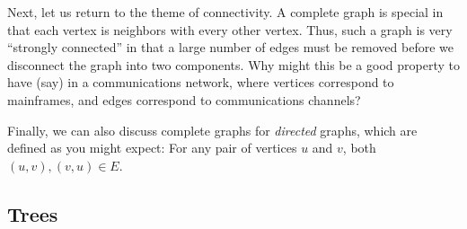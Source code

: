 \documentclass[11pt]{article}
\begin{document}

Next, let us return to the theme of connectivity. A complete graph is special in that each vertex is neighbors with every other vertex. Thus, such a graph is very ``strongly connected'' in that a large number of edges must be removed before we disconnect the graph into two components. Why might this be a good property to have (say) in a communications network, where vertices correspond to mainframes, and edges correspond to communications channels?


Finally, we can also discuss complete graphs for \emph{directed} graphs, which are defined as you might expect: For any pair of vertices $u$ and $v$, both $(u,v),(v,u)\in E$.

\subsection{Trees}\label{scn:trees}
\end{document}
